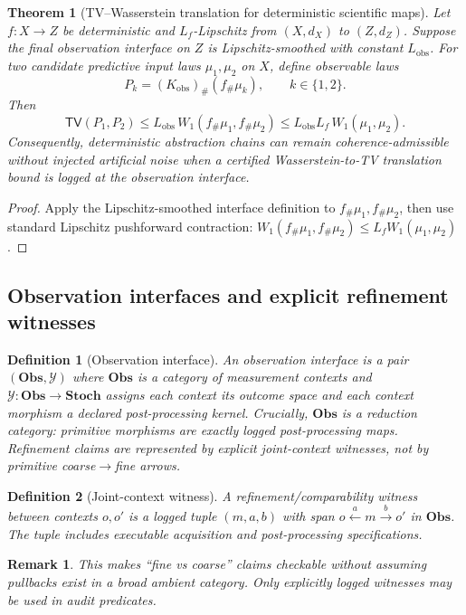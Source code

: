 \documentclass[11pt,a4paper]{article}
\newtheorem{theorem}{Theorem}[section]
\newtheorem{definition}{Definition}[section]
\newtheorem{remark}{Remark}[section]
\newcommand{\Obs}{\mathbf{Obs}}
\newcommand{\Stoch}{\mathbf{Stoch}}
\newcommand{\TV}{\mathsf{TV}}
\begin{document}
\begin{theorem}[TV--Wasserstein translation for deterministic scientific maps]
\label{thm:tv-w1}
Let $f:X\to Z$ be deterministic and $L_f$-Lipschitz from $(X,d_X)$ to $(Z,d_Z)$.
Suppose the final observation interface on $Z$ is Lipschitz-smoothed with constant $L_{\mathrm{obs}}$.
For two candidate predictive input laws $\mu_1,\mu_2$ on $X$, define observable laws
\[
P_k=(K_{\mathrm{obs}})_\#(f_\#\mu_k),\qquad k\in\{1,2\}.
\]
Then
\[
\TV(P_1,P_2)\le L_{\mathrm{obs}}\,W_1(f_\#\mu_1,f_\#\mu_2)\le L_{\mathrm{obs}}L_f\,W_1(\mu_1,\mu_2).
\]
Consequently, deterministic abstraction chains can remain coherence-admissible without injected artificial noise when a certified Wasserstein-to-TV translation bound is logged at the observation interface.
\end{theorem}
\begin{proof}
Apply the Lipschitz-smoothed interface definition to $f_\#\mu_1,f_\#\mu_2$, then use standard Lipschitz pushforward contraction:
$W_1(f_\#\mu_1,f_\#\mu_2)\le L_f W_1(\mu_1,\mu_2)$ \citep[Ch.~6]{Villani2009OT}.
\end{proof}


\subsection{Observation interfaces and explicit refinement witnesses}
\begin{definition}[Observation interface]
An observation interface is a pair $(\Obs,\mathcal{Y})$ where $\Obs$ is a category of measurement contexts and $\mathcal{Y}:\Obs\to\Stoch$ assigns each context its outcome space and each context morphism a \emph{declared post-processing kernel}.
Crucially, $\Obs$ is a \emph{reduction category}: primitive morphisms are exactly logged post-processing maps.
Refinement claims are represented by explicit joint-context witnesses, not by primitive coarse$\to$fine arrows.
\end{definition}

\begin{definition}[Joint-context witness]
A refinement/comparability witness between contexts $o,o'$ is a logged tuple $(m,a,b)$ with span
$o \xleftarrow{a} m \xrightarrow{b} o'$ in $\Obs$.
The tuple includes executable acquisition and post-processing specifications.
\end{definition}

\begin{remark}
This makes ``fine vs coarse'' claims checkable without assuming pullbacks exist in a broad ambient category.
Only explicitly logged witnesses may be used in audit predicates.
\end{remark}
\end{document}
